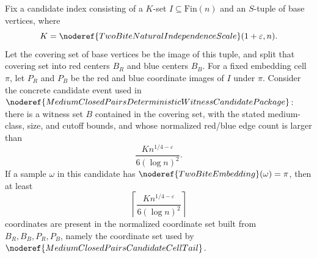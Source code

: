 \begin{helper}
Fix a candidate index consisting of a \(K\)-set \(I\subseteq \mathrm{Fin}(n)\)
and an \(S\)-tuple of base vertices, where
\[
K=\noderef{TwoBiteNaturalIndependenceScale}(1+\varepsilon,n).
\]
Let the covering set of base vertices be the image of this tuple, and split
that covering set into red centers \(B_R\) and blue centers \(B_B\).  For a
fixed embedding cell \(\pi\), let \(P_R\) and \(P_B\) be the red and blue
coordinate images of \(I\) under \(\pi\).  Consider the concrete candidate
event used in \(\noderef{MediumClosedPairsDeterministicWitnessCandidatePackage}\):
there is a witness set \(B\) contained in the covering set, with the stated
medium-class, size, and cutoff bounds, and whose normalized red/blue edge
count is larger than
\[
\frac{K n^{1/4-\varepsilon}}{6(\log n)^2}.
\]
If a sample \(\omega\) in this candidate has
\(\noderef{TwoBiteEmbedding}(\omega)=\pi\), then at least
\[
\left\lceil \frac{K n^{1/4-\varepsilon}}{6(\log n)^2}\right\rceil
\]
coordinates are present in the normalized coordinate set built from
\(B_R,B_B,P_R,P_B\), namely the coordinate set used by
\(\noderef{MediumClosedPairsCandidateCellTail}\).
\end{helper}
